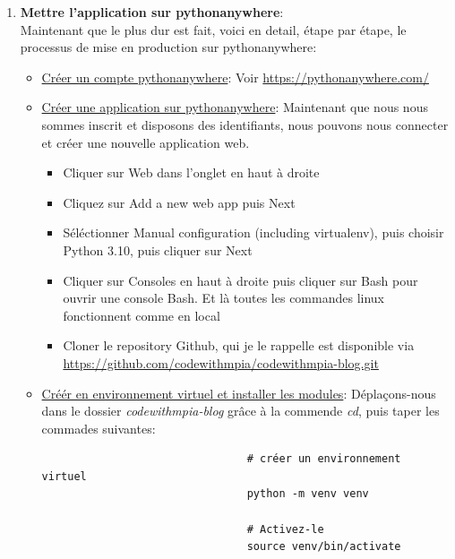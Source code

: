 \documentclass[a4paper,11pt]{article}
\begin{document}
\begin{enumerate}
            \item \textbf{Mettre l'application sur pythonanywhere}:\\
                \noindent Maintenant que le plus dur est fait, voici en detail, étape par étape, le processus de mise en production
                sur pythonanywhere:
                \begin{itemize}
                    \item \underline{Créer un compte pythonanywhere}: Voir \url{https://pythonanywhere.com/}
                    \item \underline{Créer une application sur pythonanywhere}: Maintenant que nous nous sommes 
                    inscrit et disposons des identifiants, nous pouvons nous connecter et créer une nouvelle application web. 
                    \begin{itemize}
                        \item Cliquer sur Web dans l'onglet en haut à droite
                        \item Cliquez sur Add a new web app puis Next
                        \item Séléctionner Manual configuration (including virtualenv), puis choisir Python 3.10,  puis cliquer sur Next
                        \item Cliquer sur Consoles en haut à droite puis cliquer sur Bash pour ouvrir une console Bash. Et là toutes les commandes linux fonctionnent comme 
                            en local
                        \item Cloner le repository Github, qui je le rappelle est disponible via \url{https://github.com/codewithmpia/codewithmpia-blog.git}
                    \end{itemize}
                    \item \underline{Créér en environnement virtuel et installer les modules}:
                        \noindent Déplaçons-nous dans le dossier \textit{codewithmpia-blog} grâce à la commende \textit{cd}, puis taper les commades suivantes:
                        \begin{tcolorbox}[colback=lightgray!6, colframe=black, left=-60mm, right=5mm, top=2mm, bottom=2mm, boxrule=0.1mm]
                            \begin{verbatim}
                                # créer un environnement virtuel
                                python -m venv venv

                                # Activez-le 
                                source venv/bin/activate


\end{verbatim}
\end{tcolorbox}
\end{itemize}
\end{enumerate}
\end{document}
